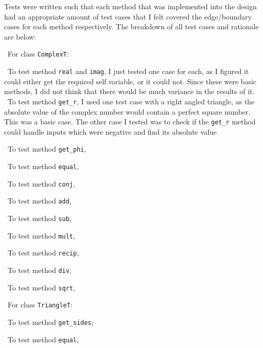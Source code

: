 \documentclass[12pt]{article}
\begin{document}
Tests were written such that each method that was implemented into the design
had an appropriate amount of test cases that I felt covered the edge/boundary 
cases for each method respectively. The breakdown of all test cases and 
rationale are below:

~\newline\noindent For class \verb|ComplexT|:

~\newline\noindent To test method \verb|real| and \verb|imag|, I just tested one case for each, 
as I figured it could either get the required self.variable, or it could not. 
Since these were basic methods, I did not think that there would be much variance 
in the results of it. 
~\newline\noindent To test method \verb|get_r|, I used one test case with a right angled triangle, as the absolute value of the complex number would contain a perfect square number. This was a basic case. The other case I tested was to check if the \verb|get_r| method could handle inputs which were negative and find its absolute value

~\newline\noindent To test method \verb|get_phi|,

~\newline\noindent To test method \verb|equal|,

~\newline\noindent To test method \verb|conj|,

~\newline\noindent To test method \verb|add|,

~\newline\noindent To test method \verb|sub|,

~\newline\noindent To test method \verb|mult|,

~\newline\noindent To test method \verb|recip|,

~\newline\noindent To test method \verb|div|,

~\newline\noindent To test method \verb|sqrt|,


~\newline\noindent For class \verb|TriangleT|:

~\newline\noindent To test method \verb|get_sides|,

~\newline\noindent To test method \verb|equal|,
\end{document}

